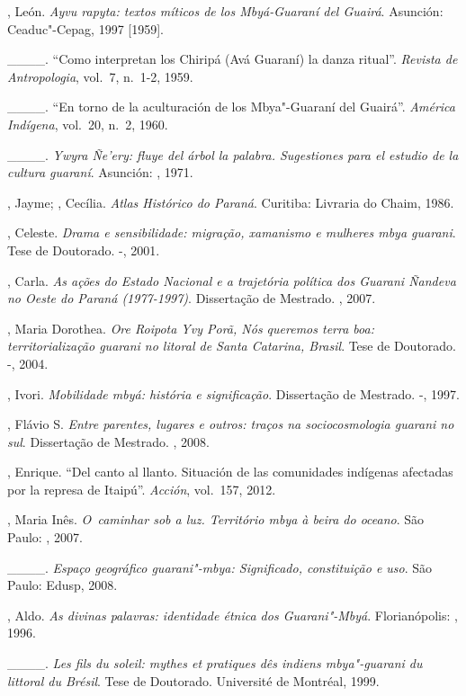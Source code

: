 \begin{Parskip}
, León. \emph{Ayvu rapyta: textos míticos de los Mbyá-Guaraní del
Guairá}. Asunción: Ceaduc"-Cepag, 1997 [1959].

\_\_\_\_. ``Como interpretan los Chiripá (Avá Guaraní) la
danza ritual''. \emph{Revista de Antropologia}, vol.~7, n.~1-2, 1959.

\_\_\_\_. ``En torno de la aculturación de los Mbya"-Guaraní
del Guairá''. \emph{América Indígena}, vol.~20, n.~2, 1960. 

\_\_\_\_. \emph{Ywyra Ñe’ery: fluye del árbol la palabra.
Sugestiones para el estudio de la cultura guaraní}. Asunción: ,
1971.

, Jayme; , Cecília. \emph{Atlas Histórico do Paraná}.
Curitiba: Livraria do Chaim, 1986.

, Celeste. \emph{Drama e sensibilidade: migração, xamanismo e
mulheres mbya guarani}. Tese de Doutorado. -, 2001.

, Carla. \emph{As ações do Estado Nacional e a
trajetória política dos Guarani Ñandeva no Oeste do Paraná (1977-1997)}.
Dissertação de Mestrado. , 2007.

, Maria Dorothea. \emph{Ore Roipota Yvy Porã, Nós queremos terra boa:
territorialização guarani no litoral de Santa Catarina, Brasil}. Tese de
Doutorado. -, 2004.

, Ivori. \emph{Mobilidade mbyá: história e significação}.
Dissertação de Mestrado. -, 1997.

, Flávio S. \emph{Entre parentes, lugares e outros: traços na
sociocosmologia guarani no sul}. Dissertação de Mestrado. , 2008.

, Enrique. ``Del canto al llanto. Situación de las comunidades
indígenas afectadas por la represa de Itaipú''. \emph{Acción}, vol.~157, 2012.

, Maria Inês. \emph{O~caminhar sob a luz. Território mbya à
beira do oceano}. São Paulo: , 2007.

\_\_\_\_. \emph{Espaço geográfico guarani"-mbya: Significado,
constituição e uso}. São Paulo: Edusp, 2008.

, Aldo. \emph{As divinas palavras: identidade étnica dos Guarani"-Mbyá}.
Florianópolis: , 1996.

\_\_\_\_. \emph{Les fils du soleil: mythes et pratiques dês
indiens mbya"-guarani du littoral du Brésil}. Tese de Doutorado.
Université de Montréal, 1999.


\end{Parskip}
